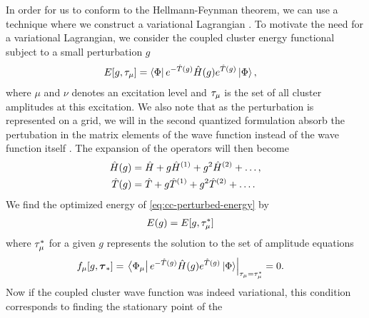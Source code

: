             In order for us to conform to the Hellmann-Feynman theorem, we can
            use a technique where we construct a variational Lagrangian
            \cite{helgaker1989}.
            To motivate the need for a variational Lagrangian, we consider the
            coupled cluster energy functional subject to a small perturbation
            $g$ \cite{monkhorst1977421}
            \begin{align}
                E[g, \tau_{\mu}]
                &= \bra{\Phi} e^{-\hat{T}(g)}
                \hat{H}(g)
                e^{\hat{T}(g)}
                \ket{\Phi},
                \label{eq:cc-perturbed-energy}
            \end{align}
            where $\mu$ and $\nu$ denotes an excitation level and
            $\tau_{\mu}$ is the set of all cluster amplitudes at this
            excitation.
            We also note that as the perturbation is represented on a grid, we
            will in the second quantized formulation absorb the pertubation in
            the matrix elements of the wave function instead of the wave
            function itself \cite{helgaker-molecular}.
            The expansion of the operators will then become
            \cite{monkhorst1977421}
            \begin{align}
                \hat{H}(g) &= \hat{H} + g\hat{H}^{(1)} + g^2\hat{H}^{(2)} + \dots, \\
                \hat{T}(g) &= \hat{T} + g\hat{T}^{(1)} + g^2\hat{T}^{(2)} + \dots.
            \end{align}
            We find the optimized energy of \autoref{eq:cc-perturbed-energy} by
            \begin{align}
                E(g) &= E[g, \tau^{*}_{\mu}]
            \end{align}
            where $\tau^{*}_{\mu}$ for a given $g$ represents the solution
            to the set of amplitude equations
            \begin{align}
                f_{\mu}[g, \boldsymbol{\tau}_{*}]
                &=
                \left.
                \bra{\Phi_{\mu}}
                e^{-\hat{T}(g)}
                \hat{H}(g)
                e^{\hat{T}(g)}
                \ket{\Phi}
                \right\rvert_{\tau_{\mu} = \tau^{*}_{\mu}}
                = 0.
                \label{eq:cc-amplitude-set}
            \end{align}
            Now if the coupled cluster wave function was indeed variational,
            this condition corresponds to finding the stationary point of the
